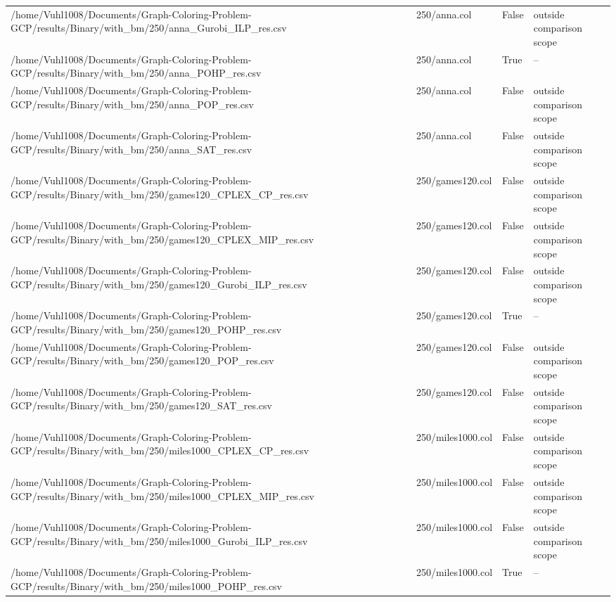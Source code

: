 \begin{table}[htbp]
\begin{tabular}{llll}
/home/Vuhl1008/Documents/Graph-Coloring-Problem-GCP/results/Binary/with\_bm/250/anna\_Gurobi\_ILP\_res.csv & 250/anna.col & False & outside comparison scope \\
/home/Vuhl1008/Documents/Graph-Coloring-Problem-GCP/results/Binary/with\_bm/250/anna\_POHP\_res.csv & 250/anna.col & True & -- \\
/home/Vuhl1008/Documents/Graph-Coloring-Problem-GCP/results/Binary/with\_bm/250/anna\_POP\_res.csv & 250/anna.col & False & outside comparison scope \\
/home/Vuhl1008/Documents/Graph-Coloring-Problem-GCP/results/Binary/with\_bm/250/anna\_SAT\_res.csv & 250/anna.col & False & outside comparison scope \\
/home/Vuhl1008/Documents/Graph-Coloring-Problem-GCP/results/Binary/with\_bm/250/games120\_CPLEX\_CP\_res.csv & 250/games120.col & False & outside comparison scope \\
/home/Vuhl1008/Documents/Graph-Coloring-Problem-GCP/results/Binary/with\_bm/250/games120\_CPLEX\_MIP\_res.csv & 250/games120.col & False & outside comparison scope \\
/home/Vuhl1008/Documents/Graph-Coloring-Problem-GCP/results/Binary/with\_bm/250/games120\_Gurobi\_ILP\_res.csv & 250/games120.col & False & outside comparison scope \\
/home/Vuhl1008/Documents/Graph-Coloring-Problem-GCP/results/Binary/with\_bm/250/games120\_POHP\_res.csv & 250/games120.col & True & -- \\
/home/Vuhl1008/Documents/Graph-Coloring-Problem-GCP/results/Binary/with\_bm/250/games120\_POP\_res.csv & 250/games120.col & False & outside comparison scope \\
/home/Vuhl1008/Documents/Graph-Coloring-Problem-GCP/results/Binary/with\_bm/250/games120\_SAT\_res.csv & 250/games120.col & False & outside comparison scope \\
/home/Vuhl1008/Documents/Graph-Coloring-Problem-GCP/results/Binary/with\_bm/250/miles1000\_CPLEX\_CP\_res.csv & 250/miles1000.col & False & outside comparison scope \\
/home/Vuhl1008/Documents/Graph-Coloring-Problem-GCP/results/Binary/with\_bm/250/miles1000\_CPLEX\_MIP\_res.csv & 250/miles1000.col & False & outside comparison scope \\
/home/Vuhl1008/Documents/Graph-Coloring-Problem-GCP/results/Binary/with\_bm/250/miles1000\_Gurobi\_ILP\_res.csv & 250/miles1000.col & False & outside comparison scope \\
/home/Vuhl1008/Documents/Graph-Coloring-Problem-GCP/results/Binary/with\_bm/250/miles1000\_POHP\_res.csv & 250/miles1000.col & True & -- \\

\end{tabular}
\end{table}

